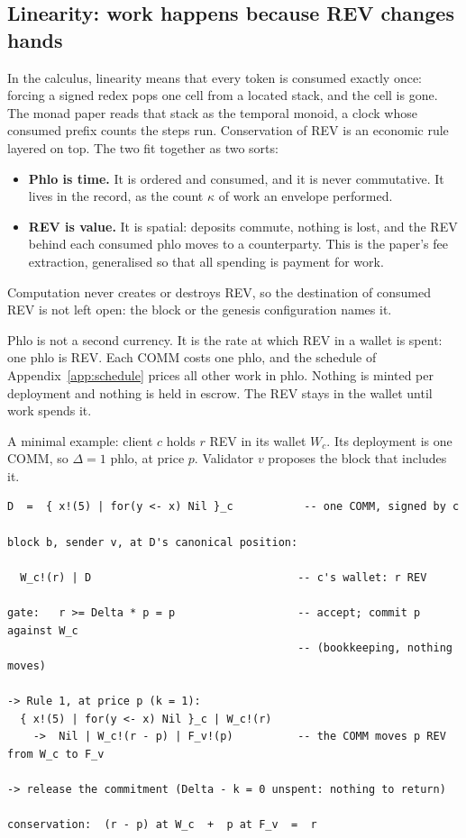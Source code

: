 \documentclass[11pt]{article}
\newcommand{\code}{\path}
\begin{document}
\subsection{Linearity: work happens because REV changes hands}\label{sec:linear}

In the calculus, linearity means that every token is consumed exactly once: forcing a signed redex pops one cell from a located stack, and the cell is gone. The monad paper reads that stack as the temporal monoid, a clock whose consumed prefix counts the steps run. Conservation of REV is an economic rule layered on top. The two fit together as two sorts:
\begin{itemize}
\item \textbf{Phlo is time.} It is ordered and consumed, and it is never commutative. It lives in the record, as the count $\kappa$ of work an envelope performed.
\item \textbf{REV is value.} It is spatial: deposits commute, nothing is lost, and the REV behind each consumed phlo moves to a counterparty. This is the paper's fee extraction, generalised so that all spending is payment for work.
\end{itemize}
Computation never creates or destroys REV, so the destination of consumed REV is not left open: the block or the genesis configuration names it.

Phlo is not a second currency. It is the rate at which REV in a wallet is spent: one phlo is \code{phloPrice} REV. Each COMM costs one phlo, and the schedule of Appendix~\ref{app:schedule} prices all other work in phlo. Nothing is minted per deployment and nothing is held in escrow. The REV stays in the wallet until work spends it.

A minimal example: client $c$ holds $r$ REV in its wallet $W_c$. Its deployment is one COMM, so $\Delta = 1$ phlo, at price $p$. Validator $v$ proposes the block that includes it.

\begin{Verbatim}[fontsize=\footnotesize,frame=single,framesep=6pt]
D  =  { x!(5) | for(y <- x) Nil }_c           -- one COMM, signed by c

block b, sender v, at D's canonical position:

  W_c!(r) | D                                -- c's wallet: r REV

gate:   r >= Delta * p = p                   -- accept; commit p against W_c
                                             -- (bookkeeping, nothing moves)

-> Rule 1, at price p (k = 1):
  { x!(5) | for(y <- x) Nil }_c | W_c!(r)
    ->  Nil | W_c!(r - p) | F_v!(p)          -- the COMM moves p REV from W_c to F_v

-> release the commitment (Delta - k = 0 unspent: nothing to return)

conservation:  (r - p) at W_c  +  p at F_v  =  r
\end{Verbatim}
\end{document}
